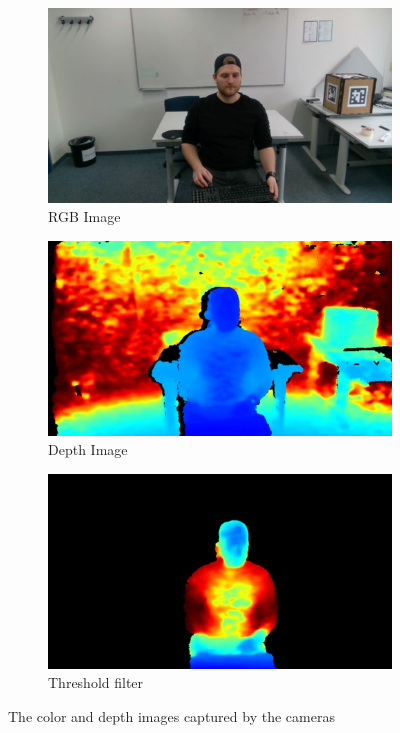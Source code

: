 \documentclass[10pt,twocolumn,letterpaper]{article}
\begin{document}
\begin{figure}
	\centering
	\begin{subfigure}[t]{.315\linewidth}
		\centering\includegraphics[width=0.9\linewidth]{imgs/rgb}
		\caption{RGB Image}
		\label{fig:rgb}
	\end{subfigure}
	\begin{subfigure}[t]{.315\linewidth}
		\centering\includegraphics[width=0.9\linewidth]{imgs/depth}
		\caption{Depth Image}
		\label{fig:depth}
	\end{subfigure}
	\begin{subfigure}[t]{.315\linewidth}
		\centering\includegraphics[width=0.9\linewidth]{imgs/threshold}
		\caption{Threshold filter}
		\label{fig:threshold}
	\end{subfigure}  
	\caption{The color and depth images captured by the \mbox{cameras}}
	\label{fig:rgbd-data}
\end{figure}
\end{document}
